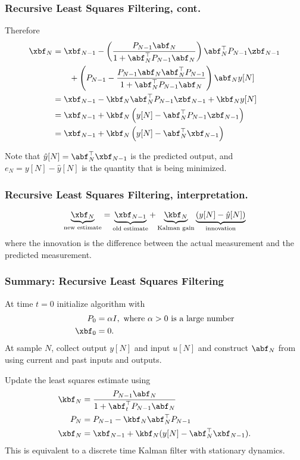 \documentclass{beamer}
\begin{document}
\begin{frame}\frametitle{Recursive Least Squares Filtering, cont.}
	Therefore
	\begin{align*}
		\xbf_N	&= \xbf_{N-1} - \left(\frac{P_{N-1}\abf_N}{1+\abf_N^\top P_{N-1}\abf_N}\right) \abf_N^\top P_{N-1}\zbf_{N-1} \\
					&\qquad + \left( P_{N-1} - \frac{P_{N-1}\abf_N\abf_N^\top P_{N-1}}{1+\abf_N^\top P_{N-1}\abf_N} \right) \abf_N y[N] \\
				&= \xbf_{N-1} - \kbf_N \abf_N^\top P_{N-1}\zbf_{N-1} + \kbf_N y[N] \\
				&= \xbf_{N-1} + \kbf_N\left( y[N] - \abf_N^\top P_{N-1}\zbf_{N-1}\right) \\
				&= \xbf_{N-1} + \kbf_N\left( y[N] - \abf_N^\top \xbf_{N-1}\right) \\
	\end{align*}

	Note that $\hat{y}[N] = \abf_N^\top \xbf_{N-1}$ is the predicted output, and $e_N=y[N]-\hat{y}[N]$ is the quantity that is being minimized.
\end{frame}

\begin{frame}\frametitle{Recursive Least Squares Filtering, interpretation.}
	\[
	\underbrace{\xbf_N}_{\text{new estimate}} = \underbrace{\xbf_{N-1}}_{\text{old estimate}}
		+ \underbrace{\kbf_N}_{\text{Kalman gain}} \underbrace{(y[N]-\hat{y}[N])}_{\text{innovation}}
	\]
	where the innovation is the difference between the actual measurement and the predicted measurement.

\end{frame}


\begin{frame}\frametitle{Summary: Recursive Least Squares Filtering}
	At time $t=0$ initialize algorithm with
	\begin{align*}
		P_0 &= \alpha I, \text{~where $\alpha>0$ is a large number} \\
		\xbf_0 &= 0.
	\end{align*}
	At sample $N$, collect output $y[N]$ and input $u[N]$ and construct $\abf_N$ from using current and past inputs and outputs.  
	
	\vfill 
	
	Update the least squares estimate using  
	\begin{align*}
  		\kbf_N &= \frac{P_{N-1} \abf_N}{1 + \abf_t^\top P_{N-1} \abf_N} \\
  		P_N &= P_{N-1} - \kbf_N \abf_N^\top P_{N-1} \\
  		\xbf_N &= \xbf_{N - 1} + \kbf_N (y[N] - \abf_N^\top \xbf_{N-1}).
	\end{align*}
This is equivalent to a discrete time Kalman filter with stationary dynamics.
	
\end{frame}
\end{document}
